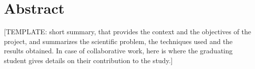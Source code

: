 \chapter*{Abstract} %

[TEMPLATE: short summary, that provides the context and the objectives of the project, and summarizes the scientific problem, the techniques used and the results obtained. In case of collaborative work, here is where the graduating student gives details on their contribution to the study.]
